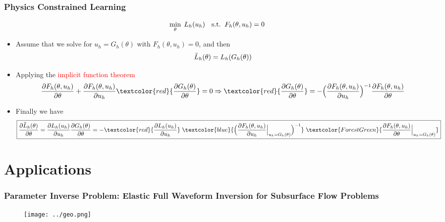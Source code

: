 \documentclass[usenames,dvipsnames]{beamer}
\begin{document}
\begin{frame}
	\frametitle{Physics Constrained Learning}
	$${\small    \min_{\theta}\; L_h(u_h) \quad \mathrm{s.t.}\;\; F_h(\theta, u_h) = 0}$$
	\begin{itemize}
		\item Assume that we solve for $u_h=G_h(\theta)$ with $F_h(\theta, u_h)=0$, and then
		      $${\small\tilde L_h(\theta)  = L_h(G_h(\theta))}$$
		\item Applying the \textcolor{red}{implicit function theorem}
		      {  \scriptsize
			      \begin{equation*}
				      \frac{{\partial {F_h(\theta, u_h)}}}{{\partial \theta }} + {\frac{{\partial {F_h(\theta, u_h)}}}{{\partial {u_h}}}}
				      \textcolor{red}{\frac{\partial G_h(\theta)}{\partial \theta}}
				      = 0 \Rightarrow
				      \textcolor{red}{\frac{\partial G_h(\theta)}{\partial \theta}} =  -\Big( \frac{{\partial {F_h(\theta, u_h)}}}{{\partial {u_h}}} \Big)^{ - 1} \frac{{\partial {F_h(\theta, u_h)}}}{{\partial \theta }}
			      \end{equation*}
		      }
		\item Finally we have
			      {\scriptsize
				      \begin{equation*}
					      \boxed{\frac{{\partial {{\tilde L}_h}(\theta )}}{{\partial \theta }}
					      = \frac{\partial {{ L}_h}(u_h )}{\partial u_h}\frac{\partial G_h(\theta)}{\partial \theta}=
					      - \textcolor{red}{ \frac{{\partial {L_h}({u_h})}}{{\partial {u_h}}} } \;
					      \textcolor{blue}{ \Big( {\frac{{\partial {F_h(\theta, u_h)}}}{{\partial {u_h}}}\Big|_{u_h = {G_h}(\theta )}} \Big)^{ - 1} } \;
					      \textcolor{ForestGreen}{ \frac{{\partial {F_h(\theta, u_h)}}}{{\partial \theta }}\Big|_{u_h = {G_h}(\theta )} }
					      }
				      \end{equation*}
			      }

	\end{itemize}

\end{frame}



\section{Applications}


\begin{frame}
	\frametitle{Parameter Inverse Problem: Elastic Full Waveform Inversion for Subsurface Flow Problems}
	\begin{figure}[hbt]
  \texttt{[image: ../geo.png]}
\end{figure}
\end{frame}
\end{document}
